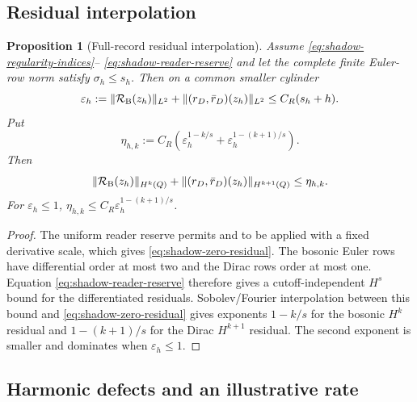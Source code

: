 \documentclass[11pt]{article}
\numberwithin{equation}{section}
\newtheorem{proposition}[proposition]{Proposition}
\theoremstyle{definition}
\theoremstyle{remark}
\newcommand{\norm}[1]{\lVert#1\rVert}
\begin{document}
\subsection{Residual interpolation}

\begin{proposition}[Full-record residual interpolation]
\label{prop:shadow-residual-upgrade}
Assume \eqref{eq:shadow-regularity-indices}--
\eqref{eq:shadow-reader-reserve} and let the complete finite Euler-row norm
satisfy $\sigma_h\le s_h$.  Then on a common smaller cylinder
\begin{equation}
 \varepsilon_h
 :=\norm{\mathcal R_{\rm B}(z_h)}_{L^2}
   +\norm{(r_D,\bar r_D)(z_h)}_{L^2}
 \le C_R(s_h+h).
 \label{eq:shadow-zero-residual}
\end{equation}
Put
\begin{equation}
 \eta_{h,k}
 :=C_R\left(
 \varepsilon_h^{1-k/s}
 +\varepsilon_h^{1-(k+1)/s}
 \right).
 \label{eq:shadow-eta}
\end{equation}
Then
\begin{equation}
 \norm{\mathcal R_{\rm B}(z_h)}_{H^k(Q)}
 +\norm{(r_D,\bar r_D)(z_h)}_{H^{k+1}(Q)}
 \le\eta_{h,k}.
 \label{eq:shadow-strong-residual}
\end{equation}
For $\varepsilon_h\le1$,
$\eta_{h,k}\le C_R\varepsilon_h^{1-(k+1)/s}$.
\end{proposition}
\begin{proof}
The uniform reader reserve permits  and
 to be applied with a fixed derivative scale,
which gives \eqref{eq:shadow-zero-residual}.  The bosonic Euler rows have
differential order at most two and the Dirac rows order at most one.
Equation \eqref{eq:shadow-reader-reserve} therefore gives a cutoff-independent
$H^s$ bound for the differentiated residuals.  Sobolev/Fourier interpolation
between this bound and \eqref{eq:shadow-zero-residual} gives exponents
$1-k/s$ for the bosonic $H^k$ residual and $1-(k+1)/s$ for the Dirac
$H^{k+1}$ residual.  The second exponent is smaller and dominates when
$\varepsilon_h\le1$.
\end{proof}

\subsection{Harmonic defects and an illustrative rate}
\end{document}
